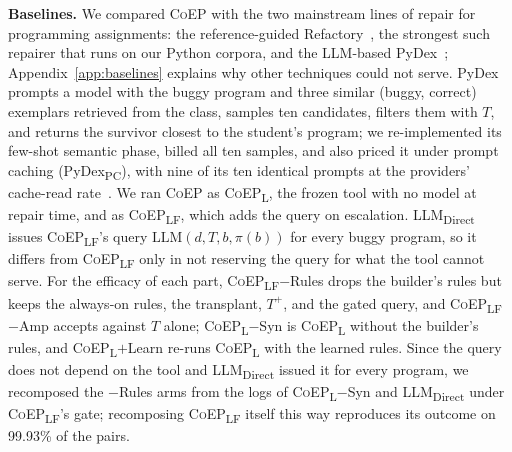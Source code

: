 \documentclass[acmsmall,screen,review,anonymous,nonacm]{acmart}
\newcommand{\tool}{\textsc{CoEP}\xspace}
\newcommand{\coepL}{\textsc{CoEP}\textsubscript{L}\xspace}
\newcommand{\coepLF}{\textsc{CoEP}\textsubscript{LF}\xspace}
\newcommand{\coepNS}{\textsc{CoEP}\textsubscript{L}$-$Syn\xspace}
\newcommand{\coepLL}{\textsc{CoEP}\textsubscript{L}$+$Learn\xspace}
\newcommand{\pydexPC}{PyDex\textsubscript{PC}\xspace}
\newcommand{\direct}{LLM\textsubscript{Direct}\xspace}
\begin{document}
\textbf{Baselines.} We compared \tool with the two mainstream lines of repair for programming assignments: the reference-guided Refactory~\cite{hu2019re}, the strongest such repairer that runs on our Python corpora, and the LLM-based PyDex~\cite{zhang2024pydex}; Appendix~\ref{app:baselines} explains why other techniques could not serve. PyDex prompts a model with the buggy program and three similar (buggy, correct) exemplars retrieved from the class, samples ten candidates, filters them with $T$, and returns the survivor closest to the student's program; we re-implemented its few-shot semantic phase, billed all ten samples, and also priced it under prompt caching (\pydexPC), with nine of its ten identical prompts at the providers' cache-read rate~\cite{anthropiccaching,openaicaching}. We ran \tool as \coepL, the frozen tool with no model at repair time, and as \coepLF, which adds the query on escalation. \direct issues \coepLF's query $\mathrm{LLM}(d, T, b, \pi(b))$ for every buggy program, so it differs from \coepLF only in not reserving the query for what the tool cannot serve. For the efficacy of each part, \coepLF$-$Rules drops the builder's rules but keeps the always-on rules, the transplant, $T^{+}$, and the gated query, and \coepLF$-$Amp accepts against $T$ alone; \coepNS is \coepL without the builder's rules, and \coepLL re-runs \coepL with the learned rules. Since the query does not depend on the tool and \direct issued it for every program, we recomposed the $-$Rules arms from the logs of \coepNS and \direct under \coepLF's gate; recomposing \coepLF itself this way reproduces its outcome on 99.93\% of the pairs.
\end{document}
